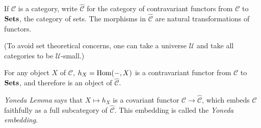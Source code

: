 \documentclass{article}
\begin{document}
If $\mathcal{C}$ is a category, write $\hat{\mathcal{C}}$ for the category of contravariant functors from $\mathcal{C}$ to ${\bf Sets}$, the category of sets.  The morphisms in $\hat{\mathcal{C}}$ are natural transformations of functors.

(To avoid set theoretical concerns, one can take a universe $\mathcal{U}$ and take all categories to be $\mathcal{U}$-small.)

For any object $X$ of $\mathcal{C}$, $h_X = {\rm Hom}(-,X)$ is a contravariant functor from $\mathcal{C}$ to ${\bf Sets}$, and therefore is an object of $\hat{\mathcal{C}}$.  

\emph{Yoneda Lemma} says that $X\mapsto h_X$ is a covariant functor $\mathcal{C}\to\hat{\mathcal{C}}$, which embeds $\mathcal{C}$ faithfully as a full subcategory of $\hat{\mathcal{C}}$. This embedding is called the \emph{Yoneda embedding}.
\end{document}
